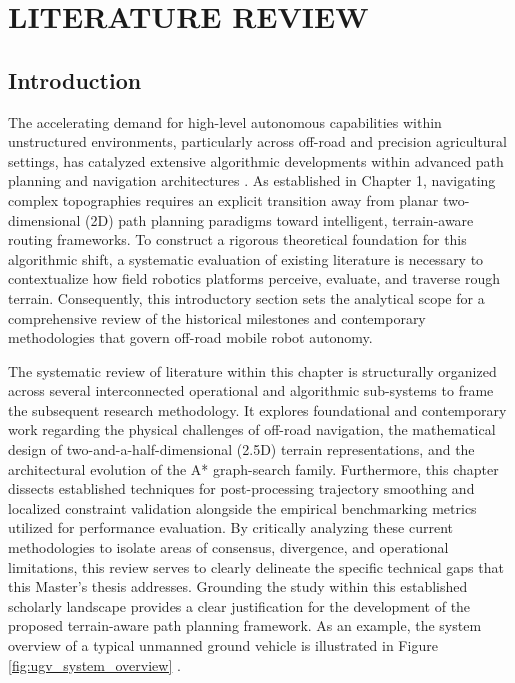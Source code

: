 \chapter{LITERATURE REVIEW}

\section{Introduction}

The accelerating demand for high-level autonomous capabilities within unstructured environments,
particularly across off-road and precision agricultural settings, has catalyzed extensive
algorithmic developments within advanced path planning and navigation architectures \citep{Hameed_2021_comprehensivereview}.
As established in Chapter 1, navigating complex topographies requires an explicit transition away
from planar two-dimensional (2D) path planning paradigms toward intelligent, terrain-aware routing
frameworks. To construct a rigorous theoretical foundation for this algorithmic shift, a systematic
evaluation of existing literature is necessary to contextualize how field robotics platforms
perceive, evaluate, and traverse rough terrain. Consequently, this introductory section sets the
analytical scope for a comprehensive review of the historical milestones and contemporary
methodologies that govern off-road mobile robot autonomy.

The systematic review of literature within this chapter is structurally organized across several
interconnected operational and algorithmic sub-systems to frame the subsequent research methodology.
It explores foundational and contemporary work regarding the physical challenges of off-road
navigation, the mathematical design of two-and-a-half-dimensional (2.5D) terrain representations,
and the architectural evolution of the A* graph-search family. Furthermore, this chapter dissects
established techniques for post-processing trajectory smoothing and localized constraint validation
alongside the empirical benchmarking metrics utilized for performance evaluation. By critically
analyzing these current methodologies to isolate areas of consensus, divergence, and operational
limitations, this review serves to clearly delineate the specific technical gaps that this Master's
thesis addresses. Grounding the study within this established scholarly landscape provides a clear
justification for the development of the proposed terrain-aware path planning framework. As an example, the system overview of a typical unmanned ground vehicle is illustrated in Figure \ref{fig:ugv_system_overview} \citep{Overbye_2022_localoffroad}.

